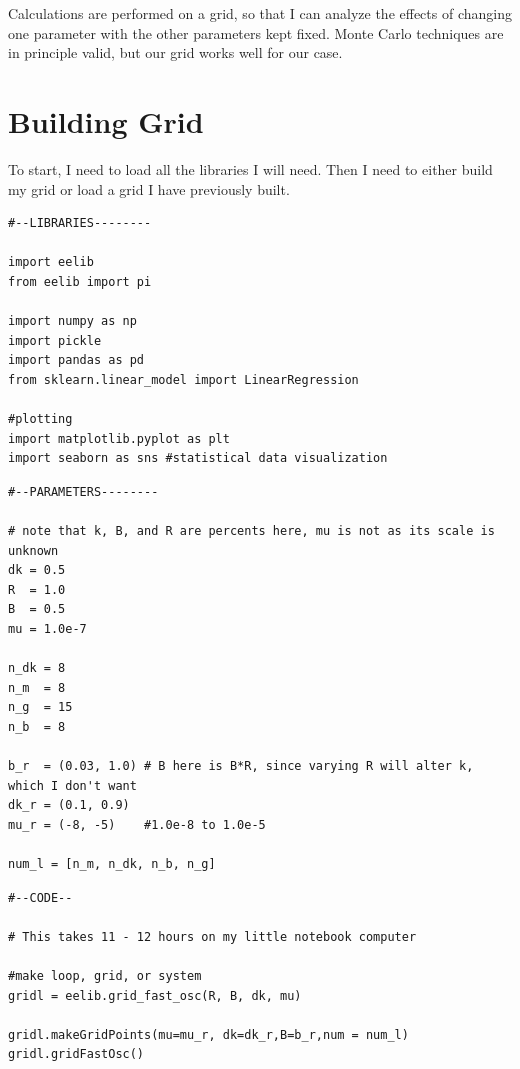 \documentclass{article}
\begin{document}
Calculations are performed on a grid, so that I can analyze the effects of changing one parameter with the other parameters kept fixed. Monte Carlo techniques are in principle valid, but our grid works well for our case.

\section{Building Grid}

To start, I need to load all the libraries I will need. Then I need to either build my grid or load a grid I have previously built.

\begin{lstlisting}
#--LIBRARIES--------

import eelib
from eelib import pi

import numpy as np
import pickle
import pandas as pd
from sklearn.linear_model import LinearRegression

#plotting
import matplotlib.pyplot as plt
import seaborn as sns #statistical data visualization\end{lstlisting}

\begin{lstlisting}
#--PARAMETERS--------

# note that k, B, and R are percents here, mu is not as its scale is unknown
dk = 0.5
R  = 1.0
B  = 0.5
mu = 1.0e-7

n_dk = 8
n_m  = 8
n_g  = 15
n_b  = 8

b_r  = (0.03, 1.0) # B here is B*R, since varying R will alter k, which I don't want
dk_r = (0.1, 0.9)
mu_r = (-8, -5)    #1.0e-8 to 1.0e-5

num_l = [n_m, n_dk, n_b, n_g]\end{lstlisting}

\begin{lstlisting}
#--CODE--

# This takes 11 - 12 hours on my little notebook computer

#make loop, grid, or system
gridl = eelib.grid_fast_osc(R, B, dk, mu)

gridl.makeGridPoints(mu=mu_r, dk=dk_r,B=b_r,num = num_l)
gridl.gridFastOsc()\end{lstlisting}
\end{document}

